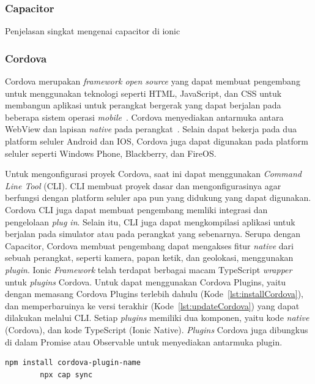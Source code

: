 \subsubsection{Capacitor}
\label{subsec:capacitor}
Penjelasan singkat mengenai capacitor di ionic

\subsubsection{Cordova}
\label{subsec:cordova}
Cordova merupakan {\it framework open source} yang dapat membuat pengembang untuk menggunakan teknologi seperti HTML, JavaScript, dan CSS untuk membangun aplikasi untuk perangkat bergerak yang dapat berjalan pada beberapa sistem operasi {\it mobile}~\cite{gonsalves:18:evaluating}. Cordova menyediakan antarmuka antara WebView dan lapisan {\it native} pada perangkat~\cite{griffith:17:mobile}. Selain dapat bekerja pada dua platform seluler Android dan IOS, Cordova juga dapat digunakan pada platform seluler seperti Windows Phone, Blackberry, dan FireOS.

Untuk mengonfigurasi proyek Cordova, saat ini dapat menggunakan {\it Command Line Tool} (CLI). CLI membuat proyek dasar dan mengonfigurasinya agar berfungsi dengan platform seluler apa pun yang didukung yang dapat digunakan. Cordova CLI juga dapat membuat pengembang memliki integrasi dan pengelolaan {\it plug in}. Selain itu, CLI juga dapat mengkompilasi aplikasi untuk berjalan pada simulator atau pada perangkat yang sebenarnya. Serupa dengan Capacitor, Cordova membuat pengembang dapat mengakses fitur {\it native} dari sebuah perangkat, seperti kamera, papan ketik, dan geolokasi, menggunakan {\it plugin}. Ionic {\it Framework} telah terdapat berbagai macam TypeScript {\it wrapper} untuk {\it plugins} Cordova.  Untuk dapat menggunakan Cordova Plugins, yaitu dengan memasang Cordova Plugins terlebih dahulu (Kode~\ref{lst:installCordova}), dan memperbaruinya ke versi terakhir (Kode~\ref{lst:updateCordova}) yang dapat dilakukan melalui CLI. Setiap {\it plugins} memiliki dua komponen, yaitu kode {\it native} (Cordova), dan kode TypeScript (Ionic Native). {\it Plugins} Cordova juga dibungkus di dalam Promise atau Observable untuk menyediakan antarmuka plugin.

\begin{lstlisting}[language=html, label={lst:installCordova}, caption=Kode untuk Memasang Cordova Plugins]
		npm install cordova-plugin-name
		npx cap sync
\end{lstlisting} 

